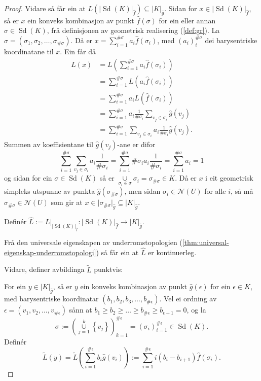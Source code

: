 \documentclass[a4paper, 12pt, norsk]{article}
\theoremstyle{plain}
\theoremstyle{definition}
\newcommand{\Nc}{\mathcal{N}}
\newcommand{\union}{ \mathop{\cup}\limits }
\newcommand{\gr}[1]{ \lvert #1 \rvert } %
\newcommand{\set}[1]{ \left\{ #1 \right\} } %
\newcommand{\tuple}[1]{ \left( #1 \right) } %
\DeclareMathOperator{\Sd}{Sd} %
\begin{document}
\begin{proof}
	Vidare så får ein at \( L(\gr{\Sd(K)}_{\hat{f}}) \subseteq \gr{K}_{\hat{g}} \). Sidan for \( x \in \gr{\Sd(K)}_{\hat{f}} \), så er \( x \) ein konveks kombinasjon av punkt \( \hat{f}(\sigma) \) for ein eller annan \( \sigma \in \Sd(K) \), frå definisjonen av geometrisk realisering (\autoref{def:gr}). La \( \sigma = (\sigma_1, \sigma_2, \dots, \sigma_{\#\sigma}) \). Då er \( x = \sum_{i=1}^{\#\sigma} a_i \hat{f}(\sigma_i) \), med \( (a_i)_i^{\#\sigma} \) dei barysentriske koordinatane til \( x \). Ein får då
	\begin{align*}
		L(x) &= L\left(\sum_{i=1}^{\#\sigma} a_i \hat{f}(\sigma_i)\right) \\
		&= \sum_{i=1}^{\#\sigma} L(a_i \hat{f}(\sigma_i)) \\
		&= \sum_{i=1}^{\#\sigma} a_i L(\hat{f}(\sigma_i)) \\
		&= \sum_{i=1}^{\#\sigma} a_i \frac{1}{\#\sigma_i} \sum_{v_j \in \sigma_i} \hat{g}(v_j) \\
		&= \sum_{i=1}^{\#\sigma} \sum_{v_j \in \sigma_i} a_i \frac{1}{\#\sigma_i} \hat{g}(v_j).
	\end{align*}
	Summen av koeffisientane til \( \hat{g}(v_j) \)-ane er difor
	\[
		\sum_{i=1}^{\#\sigma} \sum_{v_j \in \sigma_i} a_i \frac{1}{\#\sigma_i} = 
		\sum_{i=1}^{\#\sigma} \#\sigma_i a_i \frac{1}{\#\sigma_i} =
		\sum_{i=1}^{\#\sigma} a_i = 1
	\]
	og sidan for ein \( \sigma \in \Sd(K) \) så er \( \union_{\sigma_i \in \sigma} \sigma_i = \sigma_{\#\sigma} \in K \). Då er \( x \) i eit geometrisk simpleks utspunne av punkta \( \hat{g}(\sigma_{\#\sigma}) \), men sidan \( \sigma_i \in \Nc(U) \) for alle \( i \), så må \( \sigma_{\#\sigma} \in \Nc(U) \) som gir at \( x \in \gr{\sigma_{\#\sigma}}_{\hat{g}} \subseteq \gr{K}_{\hat{g}} \).

	Definér \( \hat{L} := L|_{\gr{\Sd(K)}_{\hat{f}}}: \gr{\Sd(K)}_{\hat{f}} \to \gr{K}_{\hat{g}} \).

	Frå den universale eigenskapen av underromstopologien (\autoref{thm:universal-eigenskap-underromstopologi}) så får ein at \( \hat{L} \) er kontinuerleg.

	Vidare, definer avbildinga \( \tilde{L} \) punktvis:
	
	For ein \( y \in \gr{K}_{\hat{g}} \), så er \( y \) ein konveks kombinasjon av punkt \( \hat{g}(\epsilon) \) for ein \( \epsilon \in K \), med barysentriske koordinatar \( \tuple{b_1, b_2, b_3, \dots, b_{\#\epsilon}} \). Vel ei ordning av \( \epsilon = \tuple{v_1, v_2, \dots, v_{\#\epsilon}} \) sånn at \( b_1 \geq b_2 \geq \dots \geq b_{\#\epsilon} \geq  b_{\epsilon+1}=0 \), og la
	\[
		\sigma := \tuple{\union_{j=1}^k\set{v_j}}_{k=1}^{\#\epsilon} = \tuple{\sigma_i}_{i=1}^{\#\epsilon} \in \Sd(K).
	\]
	Definér
	\[
		\tilde{L}(y) = \tilde{L}\tuple{\sum_{i=1}^{\#\epsilon} b_i \hat{g}(v_i)} := \sum_{i=1}^{\#\epsilon}i\tuple{b_i-b_{i+1}}\hat{f}(\sigma_i).
	\]


\end{proof}
\end{document}
